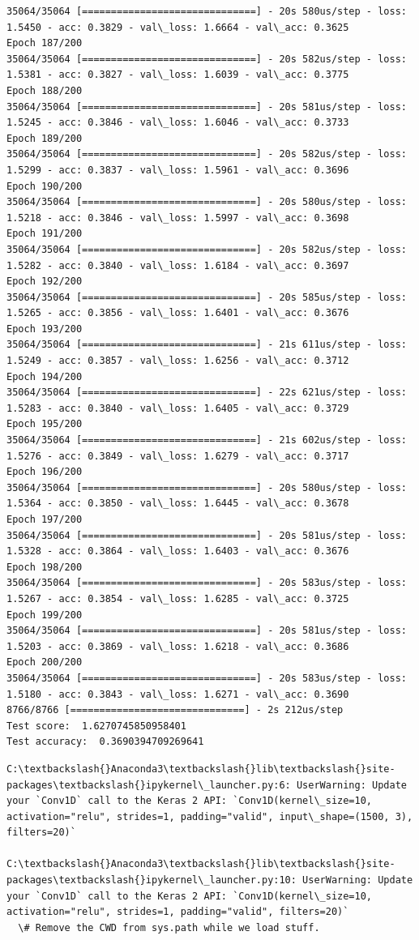 \documentclass[11pt]{article}
\begin{document}
\begin{Verbatim}[commandchars=\\\{\}]
35064/35064 [==============================] - 20s 580us/step - loss: 1.5450 - acc: 0.3829 - val\_loss: 1.6664 - val\_acc: 0.3625
Epoch 187/200
35064/35064 [==============================] - 20s 582us/step - loss: 1.5381 - acc: 0.3827 - val\_loss: 1.6039 - val\_acc: 0.3775
Epoch 188/200
35064/35064 [==============================] - 20s 581us/step - loss: 1.5245 - acc: 0.3846 - val\_loss: 1.6046 - val\_acc: 0.3733
Epoch 189/200
35064/35064 [==============================] - 20s 582us/step - loss: 1.5299 - acc: 0.3837 - val\_loss: 1.5961 - val\_acc: 0.3696
Epoch 190/200
35064/35064 [==============================] - 20s 580us/step - loss: 1.5218 - acc: 0.3846 - val\_loss: 1.5997 - val\_acc: 0.3698
Epoch 191/200
35064/35064 [==============================] - 20s 582us/step - loss: 1.5282 - acc: 0.3840 - val\_loss: 1.6184 - val\_acc: 0.3697
Epoch 192/200
35064/35064 [==============================] - 20s 585us/step - loss: 1.5265 - acc: 0.3856 - val\_loss: 1.6401 - val\_acc: 0.3676
Epoch 193/200
35064/35064 [==============================] - 21s 611us/step - loss: 1.5249 - acc: 0.3857 - val\_loss: 1.6256 - val\_acc: 0.3712
Epoch 194/200
35064/35064 [==============================] - 22s 621us/step - loss: 1.5283 - acc: 0.3840 - val\_loss: 1.6405 - val\_acc: 0.3729
Epoch 195/200
35064/35064 [==============================] - 21s 602us/step - loss: 1.5276 - acc: 0.3849 - val\_loss: 1.6279 - val\_acc: 0.3717
Epoch 196/200
35064/35064 [==============================] - 20s 580us/step - loss: 1.5364 - acc: 0.3850 - val\_loss: 1.6445 - val\_acc: 0.3678
Epoch 197/200
35064/35064 [==============================] - 20s 581us/step - loss: 1.5328 - acc: 0.3864 - val\_loss: 1.6403 - val\_acc: 0.3676
Epoch 198/200
35064/35064 [==============================] - 20s 583us/step - loss: 1.5267 - acc: 0.3854 - val\_loss: 1.6285 - val\_acc: 0.3725
Epoch 199/200
35064/35064 [==============================] - 20s 581us/step - loss: 1.5203 - acc: 0.3869 - val\_loss: 1.6218 - val\_acc: 0.3686
Epoch 200/200
35064/35064 [==============================] - 20s 583us/step - loss: 1.5180 - acc: 0.3843 - val\_loss: 1.6271 - val\_acc: 0.3690
8766/8766 [==============================] - 2s 212us/step
Test score:  1.6270745850958401
Test accuracy:  0.3690394709269641

    \end{Verbatim}

    \begin{Verbatim}[commandchars=\\\{\}]
C:\textbackslash{}Anaconda3\textbackslash{}lib\textbackslash{}site-packages\textbackslash{}ipykernel\_launcher.py:6: UserWarning: Update your `Conv1D` call to the Keras 2 API: `Conv1D(kernel\_size=10, activation="relu", strides=1, padding="valid", input\_shape=(1500, 3), filters=20)`
  
C:\textbackslash{}Anaconda3\textbackslash{}lib\textbackslash{}site-packages\textbackslash{}ipykernel\_launcher.py:10: UserWarning: Update your `Conv1D` call to the Keras 2 API: `Conv1D(kernel\_size=10, activation="relu", strides=1, padding="valid", filters=20)`
  \# Remove the CWD from sys.path while we load stuff.

    \end{Verbatim}
\end{document}
